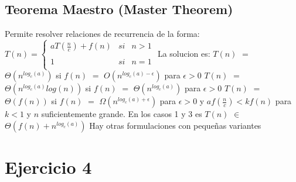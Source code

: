 \documentclass[10pt,a4paper]{article}
\begin{document}
\subsection{Teorema Maestro (Master Theorem)}

Permite resolver relaciones de recurrencia de la forma:
\newline
\newline
$T(n) = \left\{ \begin{array}{lcc}
	aT(\displaystyle \frac{n}{c}) + f(n) &   si  & n > 1 \\
	\\          1 &   si  & n = 1     \\
\end{array}
\right.$
\newline
\newline
\newline
La solucion es:
\newline
\newline
$T(n)$ $=$ $\Theta(n^{log_{c}(a)})$ si $f(n)$ $=$ $O(n^{log_{c}(a) - \epsilon})$ para $\epsilon > 0$
\newline
\newline
$T(n)$ $=$ $\Theta(n^{log_{c}(a)}log(n))$ si $f(n)$ $=$ $\Theta(n^{log_{c}(a)})$ para $\epsilon > 0$
\newline
\newline
$T(n)$ $=$ $\Theta(f(n))$ si $f(n)$ $=$ $\Omega(n^{log_{c}(a) + \epsilon})$ para $\epsilon > 0$ y $af(\displaystyle \frac{n}{c}) < kf(n)$ para $k < 1$ y $n$ suficientemente grande. 
\newline
\newline
En los casos 1 y 3 es $T(n)$ $\in$ $\Theta(f(n) + n^{log_{c}(a)})$
\newline
\newline
Hay otras formulaciones con pequeñas variantes
\newpage

\section{Ejercicio 4}
\end{document}
